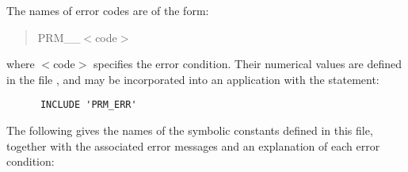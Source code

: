 The names of  error codes are of the form:

\begin{quote}
PRM\_\_$<$code$>$
\end{quote}

where $<$code$>$ specifies the error condition.
Their numerical values are defined in the file , and may be
incorporated into an application with the statement: 

\begin{verbatim}
      INCLUDE 'PRM_ERR'
\end{verbatim}

The following gives the names of the symbolic constants defined in this 
file, together with the associated error messages and an explanation of each
error condition: 

